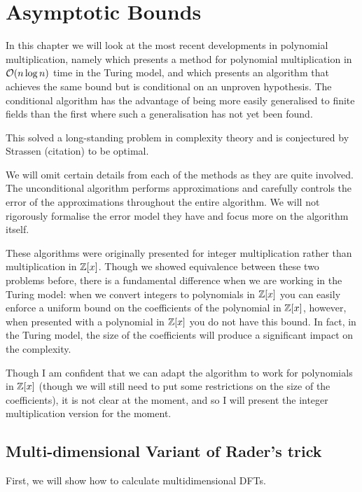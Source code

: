 \chapter{Asymptotic Bounds}\label{chp:asymptotic}

In this chapter we will look at the most recent developments in polynomial multiplication, namely \cite{nlogn} which presents a method for polynomial multiplication in $\mathcal O(n \log n)$ time in the Turing model, and \cite{ffnlogn} which presents an algorithm that achieves the same bound but is conditional on an unproven hypothesis. The conditional algorithm has the advantage of being more easily generalised to finite fields than the first where such a generalisation has not yet been found.

This solved a long-standing problem in complexity theory and is conjectured by Strassen (citation) to be optimal.

We will omit certain details from each of the methods as they are quite involved. The unconditional algorithm performs approximations and carefully controls the error of the approximations throughout the entire algorithm. We will not rigorously formalise the error model they have and focus more on the algorithm itself.

These algorithms were originally presented for integer multiplication rather than multiplication in ${\mathbb Z}[x]$. Though we showed equivalence between these two problems before, there is a fundamental difference when we are working in the Turing model: when we convert integers to polynomials in ${\mathbb Z}[x]$ you can easily enforce a uniform bound on the coefficients of the polynomial in ${\mathbb Z}[x]$, however, when presented with a polynomial in ${\mathbb Z}[x]$ you do not have this bound. In fact, in the Turing model, the size of the coefficients will produce a significant impact on the complexity. 

Though I am confident that we can adapt the algorithm to work for polynomials in ${\mathbb Z}[x]$ (though we will still need to put some restrictions on the size of the coefficients), it is not clear at the moment, and so I will present the integer multiplication version for the moment.

\section{Multi-dimensional Variant of Rader's trick}%
\label{sec:multi_dimensional_variant_of_rader_s_trick}

First, we will show how to calculate multidimensional DFTs.

